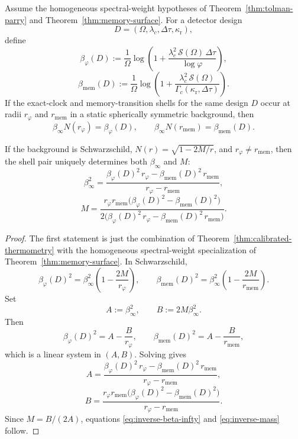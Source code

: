 \begin{theorem}\label{thm:schwarzschild-inversion}
Assume the homogeneous spectral-weight hypotheses of Theorem~\ref{thm:tolman-parry} and Theorem~\ref{thm:memory-surface}. For a detector design
\[
D=(\Omega,\lambda_c,\Delta\tau,\kappa_{\mathrm r}),
\]
define
\begin{equation}\label{eq:inverse-beta-phi}
\beta_\varphi(D)
:=
\frac{1}{\Omega}
\log\!\left(
1+\frac{\lambda_c^2\,\mathcal S(\Omega)\,\Delta\tau}{\log\varphi}
\right),
\end{equation}
\begin{equation}\label{eq:inverse-beta-mem}
\beta_{\mathrm{mem}}(D)
:=
\frac{1}{\Omega}
\log\!\left(
1+\frac{\lambda_c^2\,\mathcal S(\Omega)}{\Gamma_c(\kappa_{\mathrm r},\Delta\tau)}
\right).
\end{equation}
If the exact-clock and memory-transition shells for the same design $D$ occur at radii $r_\varphi$ and $r_{\mathrm{mem}}$ in a static spherically symmetric background, then
\begin{equation}\label{eq:inverse-general-shells}
\beta_\infty N(r_\varphi)=\beta_\varphi(D),
\qquad
\beta_\infty N(r_{\mathrm{mem}})=\beta_{\mathrm{mem}}(D).
\end{equation}

If the background is Schwarzschild, $N(r)=\sqrt{1-2M/r}$, and $r_\varphi\neq r_{\mathrm{mem}}$, then the shell pair uniquely determines both $\beta_\infty$ and $M$:
\begin{equation}\label{eq:inverse-beta-infty}
\beta_\infty^2
=
\frac{\beta_\varphi(D)^2\,r_\varphi-\beta_{\mathrm{mem}}(D)^2\,r_{\mathrm{mem}}}
{r_\varphi-r_{\mathrm{mem}}},
\end{equation}
\begin{equation}\label{eq:inverse-mass}
M
=
\frac{
r_\varphi r_{\mathrm{mem}}
\bigl(\beta_\varphi(D)^2-\beta_{\mathrm{mem}}(D)^2\bigr)
}{
2\bigl(\beta_\varphi(D)^2\,r_\varphi-\beta_{\mathrm{mem}}(D)^2\,r_{\mathrm{mem}}\bigr)
}.
\end{equation}
\end{theorem}

\begin{proof}
The first statement is just the combination of Theorem~\ref{thm:calibrated-thermometry} with the homogeneous spectral-weight specialization of Theorem~\ref{thm:memory-surface}. In Schwarzschild,
\[
\beta_\varphi(D)^2
=
\beta_\infty^2\left(1-\frac{2M}{r_\varphi}\right),
\qquad
\beta_{\mathrm{mem}}(D)^2
=
\beta_\infty^2\left(1-\frac{2M}{r_{\mathrm{mem}}}\right).
\]
Set
\[
A:=\beta_\infty^2,
\qquad
B:=2M\beta_\infty^2.
\]
Then
\[
\beta_\varphi(D)^2=A-\frac{B}{r_\varphi},
\qquad
\beta_{\mathrm{mem}}(D)^2=A-\frac{B}{r_{\mathrm{mem}}},
\]
which is a linear system in $(A,B)$. Solving gives
\[
A
=
\frac{\beta_\varphi(D)^2\,r_\varphi-\beta_{\mathrm{mem}}(D)^2\,r_{\mathrm{mem}}}
{r_\varphi-r_{\mathrm{mem}}},
\]
\[
B
=
\frac{
r_\varphi r_{\mathrm{mem}}
\bigl(\beta_\varphi(D)^2-\beta_{\mathrm{mem}}(D)^2\bigr)
}
{r_\varphi-r_{\mathrm{mem}}}.
\]
Since $M=B/(2A)$, equations \eqref{eq:inverse-beta-infty} and \eqref{eq:inverse-mass} follow.
\end{proof}

